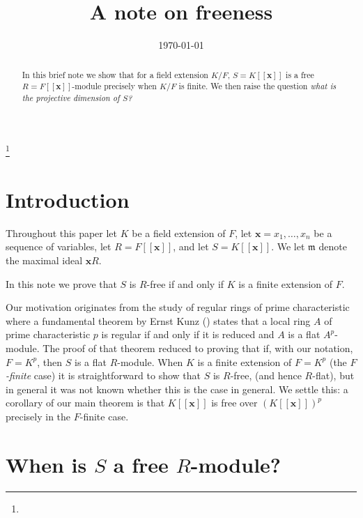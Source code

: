 \documentclass[12pt]{amsart}
\theoremstyle{plain}%
\theoremstyle{definition}
\theoremstyle{remark}
\def\fm{{\mathfrak{m}}}
\begin{document}
\title{A note on freeness}
\thanks{}


\date{\today}


\begin{abstract}
In this brief note we show that for a field extension $K/F$,
$S=K[\![\mathbf{x}]\!]$ is a free $R=F[\![\mathbf{x}]\!]$-module precisely when $K/F$ is finite.
We then raise the question \emph{what is the projective dimension of $S$?}
\end{abstract}

\maketitle

\setcounter{section}{-1}
\section{\bf Introduction}
\label{in}

Throughout this paper let $K$ be a field extension of $F$, let $\mathbf{x}=x_1, \dots, x_n$ be a sequence of variables,
let $R=F[\![\mathbf{x}]\!]$, and let $S=K[\![\mathbf{x}]\!]$. We let $\fm$ denote the maximal ideal $\mathbf{x}R$.

In this note we prove that $S$ is $R$-free if and only if $K$ is a finite extension of $F$.

Our motivation originates from the study of regular rings of prime characteristic where a fundamental theorem by Ernst Kunz (\cite[Theorem 2.1]{Kunz1969})
states that a local ring $A$ of prime characteristic $p$ is regular if and only if it is reduced and $A$ is a flat $A^p$-module. The proof of that theorem
reduced to proving that if, with our notation, $F=K^p$, then $S$ is a flat $R$-module. When $K$ is a finite extension of $F=K^p$ (the \emph{$F$-finite} case) it is straightforward to show
that $S$ is $R$-free, (and hence $R$-flat), but in general it was not known whether this is the case in general.
We settle this:
a corollary of our main theorem is that $K[\![\mathbf{x}]\!]$ is free over $(K[\![\mathbf{x}]\!])^p$
precisely in the $F$-finite case.

\section{When is $S$ a free $R$-module?}
\end{document}
